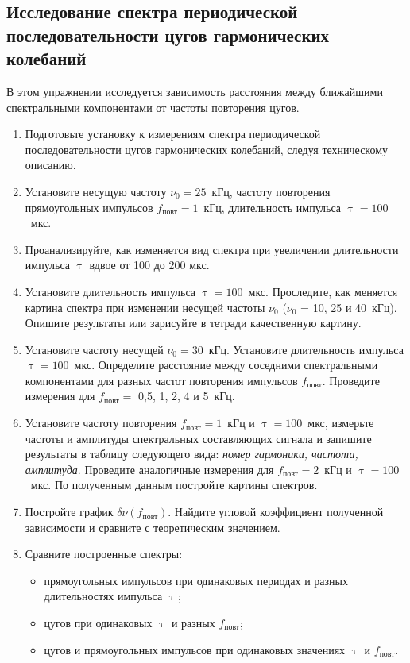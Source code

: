 \begin{lab:task}
\subsection*{Исследование спектра периодической последовательности
цугов гармонических колебаний}

В этом упражнении исследуется зависимость расстояния между ближайшими спектральными компонентами от частоты повторения цугов.

\begin{enumerate}
	\item Подготовьте установку к измерениям спектра периодической последовательности цугов гармонических колебаний, следуя техническому описанию. 
	\item Установите несущую частоту $\nu_0 = 25$~кГц, частоту повторения прямоугольных импульсов $f_{\text{повт}} = 1$~кГц, длительность импульса $\uptau = 100$~мкс.
	\item Проанализируйте, как изменяется вид спектра при увеличении длительности импульса $\uptau$ вдвое от 100 до 200 мкс.
	\item Установите длительность импульса $\uptau= 100$~мкс. Проследите, как меняется картина спектра при изменении несущей частоты $\nu_0$ ($\nu_0$ = 10, 25 и 40~кГц). Опишите результаты или зарисуйте в тетради качественную картину.
	\item Установите частоту несущей $\nu_0 = 30$~кГц. Установите длительность импульса $\uptau = 100$~мкс. Определите расстояние  между соседними спектральными компонентами для разных частот повторения импульсов $f_{\text{повт}}$. Проведите измерения для $f_{\text{повт}} =$ 0,5, 1, 2, 4 и 5~кГц.
	\item\label{task:zug_spectrum} Установите частоту повторения $f_{\text{повт}} = 1$~кГц и $\uptau = 100$~мкс, измерьте частоты и амплитуды спектральных составляющих сигнала и запишите результаты в таблицу следующего вида: \emph{номер гармоники, частота, амплитуда}. Проведите аналогичные измерения для $f_{\text{повт}} = 2$~кГц и $\uptau = 100$~мкс. По полученным данным постройте картины спектров.
	\item Постройте график $\delta \nu(f_{\text{повт}})$. Найдите угловой коэффициент полученной зависимости и сравните с теоретическим значением.
	\item Сравните построенные спектры:
	\begin{itemize}
		\item прямоугольных импульсов при одинаковых периодах и разных длительностях импульса $\uptau$;
		\item цугов при одинаковых $\uptau$ и разных $f_{\text{повт}}$;
		\item цугов и прямоугольных импульсов при одинаковых значениях $\uptau$ и  $f_{\text{повт}}$.
	\end{itemize}
\end{enumerate}


\end{lab:task}
